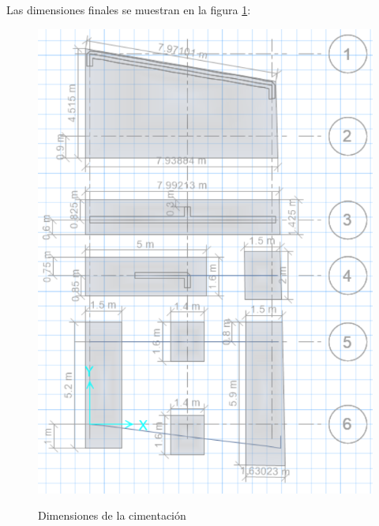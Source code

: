 Las dimensiones finales se muestran en la figura \ref{dim}:
\begin{figure}[h!]
    \centering
    \caption{Dimensiones de la cimentación}
    \includegraphics[scale=0.9]{IMAGENES/dim.PNG}
    \label{dim}
\end{figure} 

\newpage
